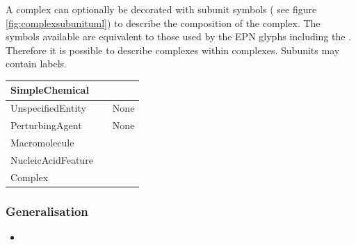 A complex can optionally be decorated with subunit symbols
( see figure \ref{fig:complexsubunituml}) to
describe the composition of the complex. The symbols available are
equivalent to those used by the EPN glyphs including the
. Therefore it is possible to describe complexes within
complexes. Subunits may contain labels. 

\begin{center}
\label{tab:subunit types}
\begin{footnotesize}
\tablelasttail{\hline}
\begin{supertabular}{|l|l|l|}\hline
SimpleChemical &   & \\\hline
UnspecifiedEntity &  & None\\\hline
PerturbingAgent &  & None\\\hline
Macromolecule &  &
\\\hline
Nucleic\-Acid\-Feature &  & \\\hline
Complex &  & \\\hline
\end{supertabular}
\end{footnotesize}
\end{center}

\subsubsection{Generalisation}

\begin{itemize}
\item {} 
\end{itemize}

